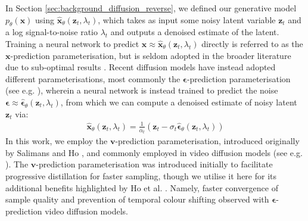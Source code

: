 \documentclass[ oneside,%
                    author={George Herbert},
                    degree={MSci},
                     title={Video Diffusion Models for Climate Simulations},
                  subtitle={}]{dissertation}
\begin{document}
In Section \ref{sec:background_diffusion_reverse}, we defined our generative model $p_\theta(\mathbf{x})$ using $\hat{\mathbf{x}}_\theta(\mathbf{z}_t,\lambda_t)$, which takes as input some noisy latent variable $\mathbf{z}_t$ and a log signal-to-noise ratio $\lambda_t$ and outputs a denoised estimate of the latent. Training a neural network to predict $\mathbf{x}\approx\hat{\mathbf{x}}_\theta(\mathbf{z}_t, \lambda_t)$ directly is referred to as the $\mathbf{x}$-prediction parameterisation, but is seldom adopted in the broader literature due to sub-optimal results \cite{DDPM_Ho}. Recent diffusion models have instead adopted different parameterisations, most commonly the $\boldsymbol\epsilon$-prediction parameterisation (see e.g. \cite{DDPM_Ho,Cascaded_Ho,Imagen_Saharia}), wherein a neural network is instead trained to predict the noise $\boldsymbol\epsilon\approx\hat{\boldsymbol\epsilon}_\theta(\mathbf{z}_t,\lambda_t)$, from which we can compute a denoised estimate of noisy latent $\mathbf{z}_t$ via:
\begin{align}
      \hat{\mathbf{x}}_\theta(\mathbf{z}_t,\lambda_t)=\frac{1}{\alpha_t}\left(\mathbf{z}_t-\sigma_t\hat{\boldsymbol\epsilon}_\theta(\mathbf{z}_t, \lambda_t)\right)
\end{align}
In this work, we employ the $\mathbf{v}$-prediction parameterisation, introduced originally by Salimans and Ho \cite{Progressive_Distillation_Salimans}, and commonly employed in video diffusion models (see e.g. \cite{VDM_Ho,Imagen_Video_Ho}). The $\mathbf{v}$-prediction parameterisation was introduced initially to facilitate progressive distillation for faster sampling, though we utilise it here for its additional benefits highlighted by Ho et al. \cite{Imagen_Video_Ho}. Namely, faster convergence of sample quality and prevention of temporal colour shifting observed with $\boldsymbol\epsilon$-prediction video diffusion models. 
\end{document}
